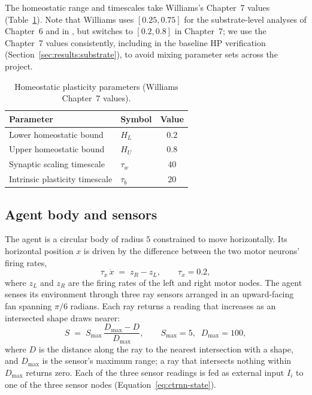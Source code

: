 The homeostatic range and timescales take Williams's Chapter~7 values
(Table~\ref{tab:hp-values}). Note that Williams uses $[0.25, 0.75]$ for the
substrate-level analyses of Chapter~6 and in \textcite{williamsnoble2007}, but
switches to $[0.2, 0.8]$ in Chapter~7; we use the Chapter~7 values consistently,
including in the baseline HP verification
(Section~\ref{sec:results:substrate}), to avoid mixing parameter sets across the
project.

\begin{table}[t]
  \centering
  \caption{Homeostatic plasticity parameters (Williams Chapter~7 values).}
  \label{tab:hp-values}
  \begin{tabular}{llc}
    \toprule
    Parameter & Symbol & Value \\
    \midrule
    Lower homeostatic bound & $H_L$    & $0.2$ \\
    Upper homeostatic bound & $H_U$    & $0.8$ \\
    Synaptic scaling timescale & $\tau_w$ & $40$ \\
    Intrinsic plasticity timescale & $\tau_b$ & $20$ \\
    \bottomrule
  \end{tabular}
\end{table}

\subsection{Agent body and sensors}
\label{sec:methods:body}

The agent is a circular body of radius $5$ constrained to move horizontally. Its
horizontal position $x$ is driven by the difference between the two motor
neurons' firing rates,
%
\begin{equation}
  \tau_x\, \dot{x} \;=\; z_R - z_L,
  \qquad \tau_x = 0.2,
  \label{eq:body}
\end{equation}
%
where $z_L$ and $z_R$ are the firing rates of the left and right motor nodes.
The agent senses its environment through three ray sensors arranged in an
upward-facing fan spanning $\pi/6$ radians. Each ray returns a reading that
increases as an intersected shape draws nearer:
%
\begin{equation}
  S \;=\; S_{\max}\,\frac{D_{\max} - D}{D_{\max}},
  \qquad S_{\max} = 5,\;\; D_{\max} = 100,
  \label{eq:sensor}
\end{equation}
%
where $D$ is the distance along the ray to the nearest intersection with a
shape, and $D_{\max}$ is the sensor's maximum range; a ray that intersects
nothing within $D_{\max}$ returns zero. Each of the three sensor readings is fed
as external input $I_i$ to one of the three sensor nodes
(Equation~\ref{eq:ctrnn-state}).

